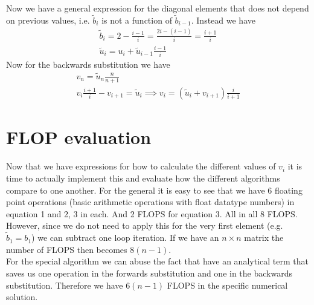 \documentclass[10pt,a4paper]{article}
\begin{document}
    Now we have a general expression for the diagonal elements that does not depend on previous values, i.e. $\tilde{b}_i$ is not a function of $\tilde{b}_{i-1}$. Instead we have
    \begin{align}
        \tilde{b}_i = 2 - \frac{i-1}{i} = \frac{2i-(i-1)}{i} =\frac{i+1}{i}\\
        \tilde{u}_i = u_i + \tilde{u}_{i-1}\tfrac{i-1}{i}
    \end{align}
    Now for the backwards substitution we have
    \begin{align}
    v_n = \tilde{u}_n\frac{n}{n+1}\\
    v_{i}\frac{i+1}{i} - v_{i+1} = \tilde{u}_{i} \implies v_i =(\tilde{u}_i+v_{i+1})\frac{i}{i+1}
    \end{align}

    \newpage{}
    \section{FLOP evaluation}
    Now that we have expressions for how to calculate the different values of $v_i$ it is time to actually implement this and evaluate how the different algorithms compare to one another.
    For the general it is easy to see that we have 6 floating point operations (basic arithmetic operations with float datatype numbers) in equation 1 and 2, 3 in each. And 2 FLOPS for equation 3. All in all 8 FLOPS.
    However, since we do not need to apply this for the very first element (e.g. $\tilde{b}_1 = b_1$) we can subtract one loop iteration. If we have an $n\times n$ matrix the number of FLOPS then becomes $8(n-1)$.\\
    For the special algorithm we can abuse the fact that have an analytical term that saves us one operation in the forwards substitution and one in the backwards substitution. Therefore we have $6(n-1)$ FLOPS in the specific numerical solution.

    \newpage{}
\end{document}
